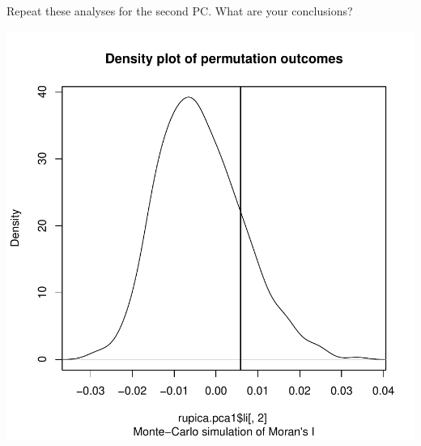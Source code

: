 \documentclass{article}
\begin{document}
Repeat these analyses for the second PC. What are your conclusions?
\begin{Schunk}
\end{Schunk}
\includegraphics{figs/spca-040}







\end{document}
